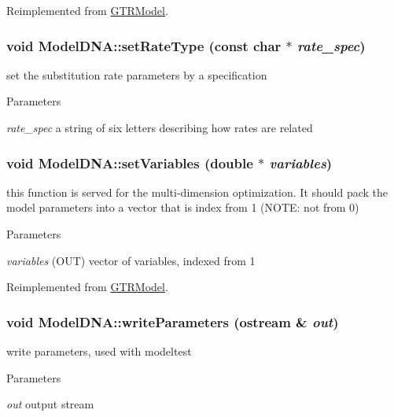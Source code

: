 Reimplemented from \hyperlink{classGTRModel_ad0625a75ce5e8f5fca7f65657b2677b8}{GTRModel}.\hypertarget{classModelDNA_a2a44458bfe1d673b6718f2b881682cee}{
\subsubsection[{setRateType}]{\setlength{\rightskip}{0pt plus 5cm}void ModelDNA::setRateType (const char $\ast$ {\em rate\_\-spec})}}
\label{classModelDNA_a2a44458bfe1d673b6718f2b881682cee}
set the substitution rate parameters by a specification 
\begin{DoxyParams}{Parameters}
\item[{\em rate\_\-spec}]a string of six letters describing how rates are related \end{DoxyParams}
\hypertarget{classModelDNA_a83af5938f0b38371b6b971931b8748c2}{
\subsubsection[{setVariables}]{\setlength{\rightskip}{0pt plus 5cm}void ModelDNA::setVariables (double $\ast$ {\em variables})}}
\label{classModelDNA_a83af5938f0b38371b6b971931b8748c2}
this function is served for the multi-\/dimension optimization. It should pack the model parameters into a vector that is index from 1 (NOTE: not from 0) 
\begin{DoxyParams}{Parameters}
\item[{\em variables}](OUT) vector of variables, indexed from 1 \end{DoxyParams}


Reimplemented from \hyperlink{classGTRModel_a1231f10a523ef280e1862b18b0549aa6}{GTRModel}.\hypertarget{classModelDNA_a46a8fd333239a3937e6116608e20cc78}{
\subsubsection[{writeParameters}]{\setlength{\rightskip}{0pt plus 5cm}void ModelDNA::writeParameters (ostream \& {\em out})}}
\label{classModelDNA_a46a8fd333239a3937e6116608e20cc78}
write parameters, used with modeltest 
\begin{DoxyParams}{Parameters}
\item[{\em out}]output stream \end{DoxyParams}


